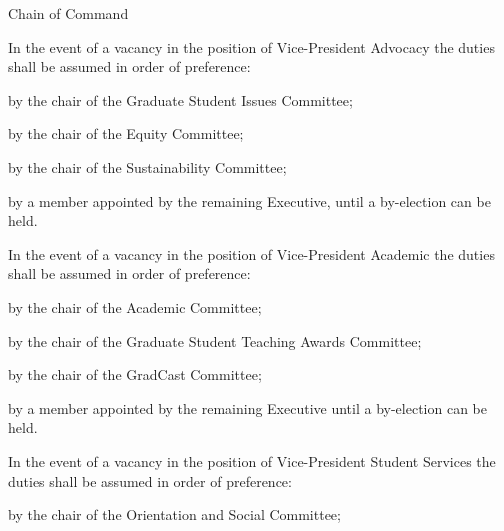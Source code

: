\begin{longenum}[ label*=\thesubsection.\arabic*., align=left]
	\item Chain of Command 
		\begin{longenum}[ label*=\arabic*., align=left]
			\item In the event of a vacancy in the position of Vice-President Advocacy the duties shall be assumed in order of preference:
			\begin{longenum}[ label*=\arabic*., align=left]
				\item by the chair of the Graduate Student Issues Committee;
				\item by the chair of the Equity Committee;
                \item by the chair of the Sustainability Committee;
				\item by a member appointed by the remaining Executive, until a by-election can be held.
			\end{longenum}
			\item In the event of a vacancy in the position of Vice-President Academic the duties shall be assumed in order of preference:
			\begin{longenum}[ label*=\arabic*., align=left]
				\item by the chair of the Academic Committee;
				\item by the chair of the Graduate Student Teaching Awards Committee;
				\item by the chair of the GradCast Committee;
				\item by a member appointed by the remaining Executive until a by-election can be held.
			\end{longenum}
			\item In the event of a vacancy in the position of Vice-President Student Services the duties shall be assumed in order of preference: 
			\begin{longenum}[ label*=\arabic*., align=left]
				\item by the chair of the Orientation and Social Committee;

\end{longenum}
\end{longenum}
\end{longenum}
